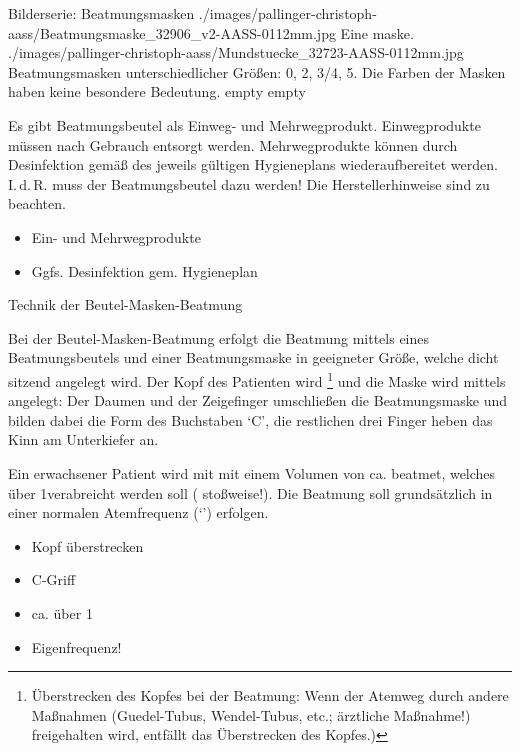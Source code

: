 \begin{PictureSeriesWide}{}{Bilderserie: Beatmungsmasken}
{./images/pallinger-christoph-aass/Beatmungsmaske_32906_v2-AASS-0112mm.jpg}
{Eine maske. }
{./images/pallinger-christoph-aass/Mundstuecke_32723-AASS-0112mm.jpg}
{Beatmungsmasken unterschiedlicher Größen:
0, 2, 3/4, 5. Die Farben der Masken haben
keine besondere Bedeutung. }
{empty}
{}
{empty}
{}
\end{PictureSeriesWide}


{%
Es gibt Beatmungsbeutel als Einweg- und Mehrwegprodukt.
Einwegprodukte müssen nach Gebrauch entsorgt werden.
Mehrwegprodukte können durch Desinfektion gemäß
des jeweils gültigen Hygieneplans wiederaufbereitet werden.
I.\,d.\,R. muss der
Beatmungsbeutel dazu  werden!
Die Herstellerhinweise sind zu beachten.
}{
\begin{itemize}
  \item Ein- und Mehrwegprodukte
  \item Ggfs. Desinfektion gem. Hygieneplan
\end{itemize}


}{}{}





\TextSlide
{Technik der Beutel-Masken-Beatmung}
{Bei der Beutel-Masken-Beatmung erfolgt die Beatmung mittels
eines Beatmungsbeutels und einer Beatmungsmaske in geeigneter
Größe, welche dicht sitzend angelegt wird.
Der Kopf des Patienten wird
\footnote{Überstrecken des Kopfes bei der
Beatmung: Wenn der Atemweg durch andere Maßnahmen
(Guedel-Tubus, Wendel-Tubus, etc.; ärztliche Maßnahme!)
freigehalten wird, entfällt das Überstrecken des Kopfes.)}
und die Maske wird mittels  angelegt: Der Daumen
und der Zeigefinger umschließen die Beatmungsmaske und
bilden dabei die Form des Buchstaben \enquote*{C}, die
restlichen drei Finger heben das Kinn am Unterkiefer an.

Ein erwachsener Patient wird mit mit einem Volumen von ca.
\EE{500\Ml*} beatmet, welches über 1\Sec* verabreicht werden
soll ( stoßweise!). Die Beatmung soll grundsätzlich
in einer normalen Atemfrequenz
(\enquote*{}) erfolgen.
}
{\begin{itemize}
  \item Kopf überstrecken
  \item C-Griff
  \item ca. \EE{500\Ml*} über 1\Sec*
  \item Eigenfrequenz!
\end{itemize}

}
{}
{}
{}





